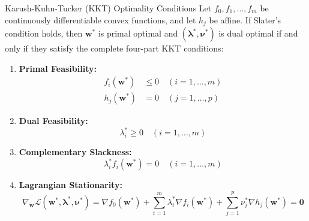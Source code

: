\begin{theorembox}{Karush-Kuhn-Tucker (KKT) Optimality Conditions}
Let $f_0, f_1, \dots, f_m$ be continuously differentiable convex functions, and let $h_j$ be affine. If Slater's condition holds, then $\mathbf{w}^*$ is primal optimal and $(\boldsymbol{\lambda}^*, \boldsymbol{\nu}^*)$ is dual optimal if and only if they satisfy the complete four-part KKT conditions:
\begin{enumerate}
    \item \textbf{Primal Feasibility:}
    \begin{align}
    f_i(\mathbf{w}^*) &\le 0 \quad (i = 1, \dots, m) \\
    h_j(\mathbf{w}^*) &= 0 \quad (j = 1, \dots, p)
    \end{align}
    \item \textbf{Dual Feasibility:}
    \begin{equation}
    \lambda_i^* \ge 0 \quad (i = 1, \dots, m)
    \end{equation}
    \item \textbf{Complementary Slackness:}
    \begin{equation}
    \lambda_i^* f_i(\mathbf{w}^*) = 0 \quad (i = 1, \dots, m)
    \label{eq:comp_slackness}
    \end{equation}
    \item \textbf{Lagrangian Stationarity:}
    \begin{equation}
    \nabla_{\mathbf{w}} \mathcal{L}(\mathbf{w}^*, \boldsymbol{\lambda}^*, \boldsymbol{\nu}^*) = \nabla f_0(\mathbf{w}^*) + \sum_{i=1}^m \lambda_i^* \nabla f_i(\mathbf{w}^*) + \sum_{j=1}^p \nu_j^* \nabla h_j(\mathbf{w}^*) = \mathbf{0}
    \label{eq:kkt_stationarity}
    \end{equation}
\end{enumerate}
\end{theorembox}

